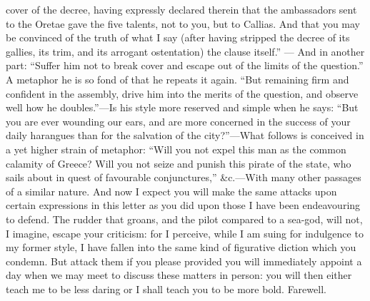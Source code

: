cover of the decree, having expressly declared therein that the
ambassadors sent to the Oretae gave the five talents, not to you, but to
Callias. And that you may be convinced of the truth of what I say (after
having stripped the decree of its gallies, its trim, and its arrogant
ostentation) the clause itself.'' — And in another part: ``Suffer him
not to break cover and escape out of the limits of the question.'' A
metaphor he is so fond of that he repeats it again. ``But remaining firm
and confident in the assembly, drive him into the merits of the question,
and observe well how he doubles.''—Is his style more reserved and
simple when he says: ``But you are ever wounding our ears, and are more
concerned in the success of your daily harangues than for the salvation of
the city?''—What follows is conceived in a yet higher strain of
metaphor: ``Will you not expel this man as the common calamity of Greece?
Will you not seize and punish this pirate of the state, who sails about in
quest of favourable conjunctures,'' \&c.—With many other passages
of a similar nature. And now I expect you will make the same attacks upon
certain expressions in this letter as you did upon those I have been
endeavouring to defend. The rudder that groans, and the pilot compared to
a sea-god, will not, I imagine, escape your criticism: for I perceive,
while I am suing for indulgence to my former style, I have fallen into the
same kind of figurative diction which you condemn. But attack them if you
please provided you will immediately appoint a day when we may meet to
discuss these matters in person: you will then either teach me to be less
daring or I shall teach you to be more bold. Farewell.


